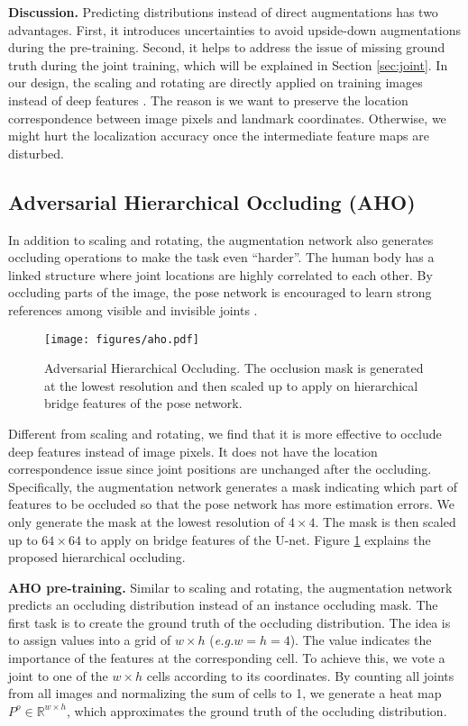 \documentclass[10pt,twocolumn,letterpaper]{article}
\begin{document}
{\bf Discussion.} Predicting distributions instead of direct augmentations has two advantages. First, it introduces uncertainties to avoid upside-down augmentations during the pre-training. Second, it helps to address the issue of missing ground truth during the joint training, which will be explained in Section \ref{sec:joint}. In our design, the scaling and rotating are directly applied on training images instead of deep features \cite{wang2017fast}. The reason is we want to preserve the location correspondence between image pixels and landmark coordinates. Otherwise, we might hurt the localization accuracy once the intermediate feature maps are disturbed.

\subsection{Adversarial Hierarchical Occluding (AHO)}\label{sec:aho}

In addition to scaling and rotating, the augmentation network also generates occluding operations to make the task even ``harder''. The human body has a linked structure where joint locations are highly correlated to each other. By occluding parts of the image, the pose network is encouraged to learn strong references among visible and invisible joints \cite{peng2015circle}.

\begin{figure}[t!]
\centering
\texttt{[image: figures/aho.pdf]}
\caption{Adversarial Hierarchical Occluding. The occlusion mask is generated at the lowest resolution and then scaled up to apply on hierarchical bridge features of the pose network.}
\label{fig:aho}
\end{figure}

Different from scaling and rotating, we find that it is more effective to occlude deep features instead of image pixels. It does not have the location correspondence issue since joint positions are unchanged after the occluding. Specifically, the augmentation network generates a mask indicating which part of features to be occluded so that the pose network has more estimation errors. We only generate the mask at the lowest resolution of $4 \times 4$. The mask is then scaled up to $64 \times 64$ to apply on bridge features of the U-net. Figure \ref{fig:aho} explains the proposed hierarchical occluding.

{\bf AHO pre-training.} Similar to scaling and rotating, the augmentation network predicts an occluding distribution instead of an instance occluding mask. The first task is to create the ground truth of the occluding distribution. The idea is to assign values into a grid of $w \times h$ ({\it e.g.}$w=h=4$). The value indicates the importance of the features at the corresponding cell. To achieve this, we vote a joint to one of the $w \times h$ cells according to its coordinates. By counting all joints from all images and normalizing the sum of cells to 1, we generate a heat map $P^o \in \mathbb{R}^{w \times h}$, which approximates the ground truth of the occluding distribution.
\end{document}
